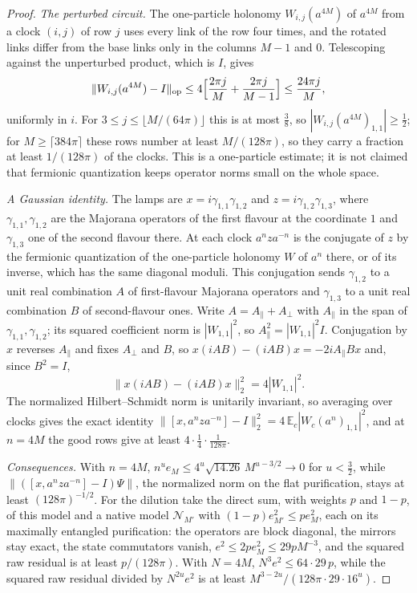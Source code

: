 \begin{proof}
\emph{The perturbed circuit.} The one-particle holonomy $W_{i,j}(a^{4M})$ of $a^{4M}$ from a clock $(i,j)$ of row $j$ uses every link of the
row four times, and the rotated links differ from the base links only in the columns $M-1$ and $0$. Telescoping against the
unperturbed product, which is $I$, gives
\[
\lVert W_{i,j}(a^{4M})-I\rVert_{\mathrm{op}}\le4\Bigl[\frac{2\pi j}M+\frac{2\pi j}{M-1}\Bigr]\le\frac{24\pi j}M ,
\]
uniformly in $i$. For $3\le j\le\lfloor M/(64\pi)\rfloor$ this is at most $\frac38$, so $|W_{i,j}(a^{4M})_{1,1}|\ge\frac12$; for
$M\ge\lceil384\pi\rceil$ these rows number at least $M/(128\pi)$, so they carry a fraction at least $1/(128\pi)$ of the clocks. This is a
one-particle estimate; it is not claimed that fermionic quantization keeps operator norms small on the whole space.

\emph{A Gaussian identity.} The lamps are $x=i\gamma_{1,1}\gamma_{1,2}$ and $z=i\gamma_{1,2}\gamma_{1,3}$, where $\gamma_{1,1},\gamma_{1,2}$ are the
Majorana operators of the first flavour at the coordinate $1$ and $\gamma_{1,3}$ one of the second flavour there. At each clock
$a^nza^{-n}$ is the conjugate of $z$ by the fermionic quantization of the one-particle holonomy $W$ of $a^n$ there, or of its inverse,
which has the same diagonal moduli. This conjugation sends $\gamma_{1,2}$ to a unit real combination $A$ of first-flavour Majorana
operators and $\gamma_{1,3}$ to a unit real combination $B$ of second-flavour ones. Write $A=A_\parallel+A_\perp$ with $A_\parallel$ in the
span of $\gamma_{1,1},\gamma_{1,2}$; its squared coefficient norm is $|W_{1,1}|^2$, so $A_\parallel^2=|W_{1,1}|^2I$. Conjugation by $x$ reverses
$A_\parallel$ and fixes $A_\perp$ and $B$, so $x(iAB)-(iAB)x=-2iA_\parallel Bx$ and, since $B^2=I$,
\[
\|x(iAB)-(iAB)x\|_2^2=4|W_{1,1}|^2 .
\]
The normalized Hilbert--Schmidt norm is unitarily invariant, so averaging over clocks gives the exact identity
$\|[x,a^nza^{-n}]-I\|_2^2=4\,\mathbb E_c|W_c(a^n)_{1,1}|^2$, and at $n=4M$ the good rows give at least $4\cdot\frac14\cdot\frac1{128\pi}$.

\emph{Consequences.} With $n=4M$, $n^ue_M\le4^u\sqrt{14.26}\,M^{u-3/2}\to0$ for $u<\frac32$, while $\|([x,a^nza^{-n}]-I)\Psi\|$, the
normalized norm on the flat purification, stays at least $(128\pi)^{-1/2}$. For the dilution take the direct sum, with weights $p$ and
$1-p$, of this model and a native model $\mathcal N_{M'}$ with $(1-p)e_{M'}^2\le pe_M^2$, each on its maximally entangled purification:
the operators are block diagonal, the mirrors stay exact, the state commutators vanish, $e^2\le2pe_M^2\le29pM^{-3}$, and the squared raw
residual is at least $p/(128\pi)$. With $N=4M$, $N^3e^2\le64\cdot29\,p$, while the squared raw residual divided by $N^{2u}e^2$ is at least
$M^{3-2u}/(128\pi\cdot29\cdot16^u)$.
\end{proof}


